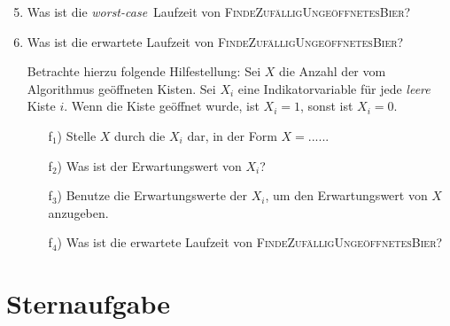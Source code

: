 \documentclass{uebung_cs}
\begin{document}
\begin{aufgabe}[Bierkisten]
	\begin{enumerate}
		\setcounter{enumi}{4}
		\item Was ist die \textit{worst-case}~Laufzeit von \textsc{FindeZufälligUngeöffnetesBier}?
		\item Was ist die erwartete Laufzeit von \textsc{FindeZufälligUngeöffnetesBier}?
		\item[] Betrachte hierzu folgende Hilfestellung: Sei $X$ die Anzahl der vom Algorithmus geöffneten Kisten. Sei $X_i$ eine Indikatorvariable für jede \emph{leere} Kiste $i$. Wenn die Kiste geöffnet wurde, ist $X_i = 1$, sonst ist $X_i = 0$. 
		\begin{itemize}[topsep=0.21cm, leftmargin=1.2cm]
			\item[f$_1$)] Stelle $X$ durch die $X_i$ dar, in der Form $X = .....$.
			\item[f$_2$)] Was ist der Erwartungswert von $X_i$?
			\item[f$_3$)] Benutze die Erwartungswerte der $X_i$, um den Erwartungswert von $X$ anzugeben.
			\item[f$_4$)] Was ist die erwartete Laufzeit von \textsc{FindeZufälligUngeöffnetesBier}?
		\end{itemize}
	\end{enumerate}
\end{aufgabe}

\newpage
\section*{Sternaufgabe}
\end{document}
